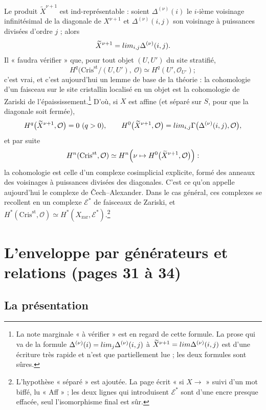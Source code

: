 \documentclass[11pt,a4paper]{article}
\begin{document}
Le produit $\widetilde{X}^{\nu+1}$ est ind-représentable : soient
$\Delta^{(\nu)}(i)$ le $i$-ième voisinage infinitésimal de la diagonale de
$X^{\nu+1}$ et $\Delta^{(\nu)}(i, j)$ son voisinage à puissances divisées
d'ordre $j$ ; alors
\[
\widetilde{X}^{\nu+1} = \varinjlim_{i, j} \Delta^{(\nu)}(i, j).
\]
Il « faudra vérifier » que, pour tout objet $(U, U')$ du site stratifié,
\[
H^{q}\bigl(\mathrm{Cris}^{\mathrm{st}}/(U, U'),\ \mathcal{O}\bigr) \simeq
H^{q}(U', \mathcal{O}_{U'}) ;
\]
c'est vrai, et c'est aujourd'hui un lemme de base de la théorie : la
cohomologie d'un faisceau sur le site cristallin localisé en un objet est la
cohomologie de Zariski de l'épaississement.\footnote{La note marginale « à
vérifier » est en regard de cette formule. La prose qui va de la formule
$\Delta^{(\nu)}(i) = \varinjlim_j \Delta^{(\nu)}(i, j)$ à
$\widetilde{X}^{\nu+1} = \varinjlim \Delta^{(\nu)}(i,j)$ est d'une écriture
très rapide et n'est que partiellement lue ; les deux formules sont sûres.}
D'où, si $X$ est affine (et séparé sur $S$, pour que la diagonale soit
fermée),
\[
H^{q}\bigl(\widetilde{X}^{\nu+1}, \mathcal{O}\bigr) = 0 \ (q > 0), \qquad
H^{0}\bigl(\widetilde{X}^{\nu+1}, \mathcal{O}\bigr) = \varprojlim_{i,j}
\Gamma\bigl(\Delta^{(\nu)}(i,j), \mathcal{O}\bigr),
\]
et par suite
\[
H^{n}(\mathrm{Cris}^{\mathrm{st}}, \mathcal{O}) \simeq H^{n}\Bigl(\nu
\mapsto H^{0}\bigl(\widetilde{X}^{\nu+1}, \mathcal{O}\bigr)\Bigr) :
\]
la cohomologie est celle d'un complexe cosimplicial explicite, formé des
anneaux des voisinages à puissances divisées des diagonales. C'est ce
qu'on appelle aujourd'hui le complexe de Čech--Alexander. Dans le cas
général, ces complexes se recollent en un complexe $\mathcal{E}^{*}$ de
faisceaux de Zariski, et $H^{*}(\mathrm{Cris}^{\mathrm{st}}, \mathcal{O})
\simeq H^{*}(X_{\mathrm{zar}}, \mathcal{E}^{*})$.\footnote{L'hypothèse
« séparé » est ajoutée. La page écrit « si $X \to$ » suivi d'un mot biffé,
lu « Aff » ; les deux lignes qui introduisent $\mathcal{E}^{*}$ sont d'une
encre presque effacée, seul l'isomorphisme final est sûr.}

\section*{L'enveloppe par générateurs et relations (pages 31 à 34)}

\subsection*{La présentation}
\end{document}
